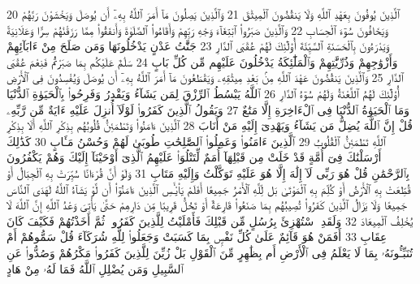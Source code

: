 {\tiny\colorbox{cl_aya}{20}} ٱلَّذِينَ يُوفُونَ بِعَهْدِ ٱللَّهِ وَلَا يَنقُضُونَ ٱلْمِيثَٰقَ
{\tiny\colorbox{cl_aya}{21}} وَٱلَّذِينَ يَصِلُونَ مَآ أَمَرَ ٱللَّهُ بِهِۦٓ أَن يُوصَلَ وَيَخْشَوْنَ رَبَّهُمْ وَيَخَافُونَ سُوٓءَ ٱلْحِسَابِ
{\tiny\colorbox{cl_aya}{22}} وَٱلَّذِينَ صَبَرُوا۟ ٱبْتِغَآءَ وَجْهِ رَبِّهِمْ وَأَقَامُوا۟ ٱلصَّلَوٰةَ وَأَنفَقُوا۟ مِمَّا رَزَقْنَٰهُمْ سِرًّا وَعَلَانِيَةً وَيَدْرَءُونَ بِٱلْحَسَنَةِ ٱلسَّيِّئَةَ أُو۟لَٰٓئِكَ لَهُمْ عُقْبَى ٱلدَّارِ
{\tiny\colorbox{cl_aya}{23}} جَنَّٰتُ عَدْنٍ يَدْخُلُونَهَا وَمَن صَلَحَ مِنْ ءَابَآئِهِمْ وَأَزْوَٰجِهِمْ وَذُرِّيَّٰتِهِمْ وَٱلْمَلَٰٓئِكَةُ يَدْخُلُونَ عَلَيْهِم مِّن كُلِّ بَابٍ
{\tiny\colorbox{cl_aya}{24}} سَلَٰمٌ عَلَيْكُم بِمَا صَبَرْتُمْ فَنِعْمَ عُقْبَى ٱلدَّارِ
{\tiny\colorbox{cl_aya}{25}} وَٱلَّذِينَ يَنقُضُونَ عَهْدَ ٱللَّهِ مِنۢ بَعْدِ مِيثَٰقِهِۦ وَيَقْطَعُونَ مَآ أَمَرَ ٱللَّهُ بِهِۦٓ أَن يُوصَلَ وَيُفْسِدُونَ فِى ٱلْأَرْضِ أُو۟لَٰٓئِكَ لَهُمُ ٱللَّعْنَةُ وَلَهُمْ سُوٓءُ ٱلدَّارِ
{\tiny\colorbox{cl_aya}{26}} ٱللَّهُ يَبْسُطُ ٱلرِّزْقَ لِمَن يَشَآءُ وَيَقْدِرُ وَفَرِحُوا۟ بِٱلْحَيَوٰةِ ٱلدُّنْيَا وَمَا ٱلْحَيَوٰةُ ٱلدُّنْيَا فِى ٱلْءَاخِرَةِ إِلَّا مَتَٰعٌ
{\tiny\colorbox{cl_aya}{27}} وَيَقُولُ ٱلَّذِينَ كَفَرُوا۟ لَوْلَآ أُنزِلَ عَلَيْهِ ءَايَةٌ مِّن رَّبِّهِۦ قُلْ إِنَّ ٱللَّهَ يُضِلُّ مَن يَشَآءُ وَيَهْدِىٓ إِلَيْهِ مَنْ أَنَابَ
{\tiny\colorbox{cl_aya}{28}} ٱلَّذِينَ ءَامَنُوا۟ وَتَطْمَئِنُّ قُلُوبُهُم بِذِكْرِ ٱللَّهِ أَلَا بِذِكْرِ ٱللَّهِ تَطْمَئِنُّ ٱلْقُلُوبُ
{\tiny\colorbox{cl_aya}{29}} ٱلَّذِينَ ءَامَنُوا۟ وَعَمِلُوا۟ ٱلصَّٰلِحَٰتِ طُوبَىٰ لَهُمْ وَحُسْنُ مَـَٔابٍ
{\tiny\colorbox{cl_aya}{30}} كَذَٰلِكَ أَرْسَلْنَٰكَ فِىٓ أُمَّةٍ قَدْ خَلَتْ مِن قَبْلِهَآ أُمَمٌ لِّتَتْلُوَا۟ عَلَيْهِمُ ٱلَّذِىٓ أَوْحَيْنَآ إِلَيْكَ وَهُمْ يَكْفُرُونَ بِٱلرَّحْمَٰنِ قُلْ هُوَ رَبِّى لَآ إِلَٰهَ إِلَّا هُوَ عَلَيْهِ تَوَكَّلْتُ وَإِلَيْهِ مَتَابِ
{\tiny\colorbox{cl_aya}{31}} وَلَوْ أَنَّ قُرْءَانًا سُيِّرَتْ بِهِ ٱلْجِبَالُ أَوْ قُطِّعَتْ بِهِ ٱلْأَرْضُ أَوْ كُلِّمَ بِهِ ٱلْمَوْتَىٰ بَل لِّلَّهِ ٱلْأَمْرُ جَمِيعًا أَفَلَمْ يَا۟يْـَٔسِ ٱلَّذِينَ ءَامَنُوٓا۟ أَن لَّوْ يَشَآءُ ٱللَّهُ لَهَدَى ٱلنَّاسَ جَمِيعًا وَلَا يَزَالُ ٱلَّذِينَ كَفَرُوا۟ تُصِيبُهُم بِمَا صَنَعُوا۟ قَارِعَةٌ أَوْ تَحُلُّ قَرِيبًا مِّن دَارِهِمْ حَتَّىٰ يَأْتِىَ وَعْدُ ٱللَّهِ إِنَّ ٱللَّهَ لَا يُخْلِفُ ٱلْمِيعَادَ
{\tiny\colorbox{cl_aya}{32}} وَلَقَدِ ٱسْتُهْزِئَ بِرُسُلٍ مِّن قَبْلِكَ فَأَمْلَيْتُ لِلَّذِينَ كَفَرُوا۟ ثُمَّ أَخَذْتُهُمْ فَكَيْفَ كَانَ عِقَابِ
{\tiny\colorbox{cl_aya}{33}} أَفَمَنْ هُوَ قَآئِمٌ عَلَىٰ كُلِّ نَفْسٍۭ بِمَا كَسَبَتْ وَجَعَلُوا۟ لِلَّهِ شُرَكَآءَ قُلْ سَمُّوهُمْ أَمْ تُنَبِّـُٔونَهُۥ بِمَا لَا يَعْلَمُ فِى ٱلْأَرْضِ أَم بِظَٰهِرٍ مِّنَ ٱلْقَوْلِ بَلْ زُيِّنَ لِلَّذِينَ كَفَرُوا۟ مَكْرُهُمْ وَصُدُّوا۟ عَنِ ٱلسَّبِيلِ وَمَن يُضْلِلِ ٱللَّهُ فَمَا لَهُۥ مِنْ هَادٍ
